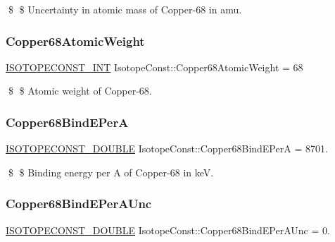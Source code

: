 \$ \$ Uncertainty in atomic mass of Copper-\/68 in amu. \mbox{\label{group___isotope_const-_copper-_cu68_ga24cad10d692c0861703684aed941128d}} 
\subsubsection{\texorpdfstring{Copper68\+Atomic\+Weight}{Copper68AtomicWeight}}
{\footnotesize\ttfamily \mbox{\hyperlink{group___isotope_const-_macros_ga5f18360b3e99483a35c32d789e62621c}{I\+S\+O\+T\+O\+P\+E\+C\+O\+N\+S\+T\+\_\+\+I\+NT}} Isotope\+Const\+::\+Copper68\+Atomic\+Weight = 68}

\$ \$ Atomic weight of Copper-\/68. \mbox{\label{group___isotope_const-_copper-_cu68_ga264099c0671fe227466020e98b708ee6}} 
\subsubsection{\texorpdfstring{Copper68\+Bind\+E\+PerA}{Copper68BindEPerA}}
{\footnotesize\ttfamily \mbox{\hyperlink{group___isotope_const-_macros_ga8f45a7272ce02c0b4c65c44636ed719a}{I\+S\+O\+T\+O\+P\+E\+C\+O\+N\+S\+T\+\_\+\+D\+O\+U\+B\+LE}} Isotope\+Const\+::\+Copper68\+Bind\+E\+PerA = 8701.}

\$ \$ Binding energy per A of Copper-\/68 in keV. \mbox{\label{group___isotope_const-_copper-_cu68_ga050520e586697e1f1bf8c8180fd5159b}} 
\subsubsection{\texorpdfstring{Copper68\+Bind\+E\+Per\+A\+Unc}{Copper68BindEPerAUnc}}
{\footnotesize\ttfamily \mbox{\hyperlink{group___isotope_const-_macros_ga8f45a7272ce02c0b4c65c44636ed719a}{I\+S\+O\+T\+O\+P\+E\+C\+O\+N\+S\+T\+\_\+\+D\+O\+U\+B\+LE}} Isotope\+Const\+::\+Copper68\+Bind\+E\+Per\+A\+Unc = 0.}

